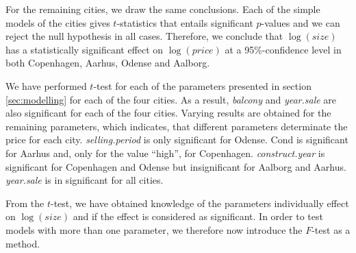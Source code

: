 For the remaining cities, we draw the same conclusions. 
Each of the simple models of the cities gives $t$-statistics that entails significant $p$-values and we can reject the null hypothesis in all cases. 
Therefore, we conclude that $\log(size)$ has a statistically significant effect on $\log(price)$ at a 95\%-confidence level in both Copenhagen, Aarhus, Odense and Aalborg. 

We have performed $t$-test for each of the parameters presented in section \ref{sec:modelling} for each of the four cities. As a result, \textit{balcony} and \textit{year.sale} are also significant for each of the four cities. 
Varying results are obtained for the remaining parameters, which indicates, that different parameters determinate the price for each city. \textit{selling.period} is only significant for Odense. 
Cond is significant for Aarhus and, only for the value ``high'', for Copenhagen. 
\textit{construct.year} is significant for Copenhagen and Odense but insignificant for Aalborg and Aarhus.
\textit{year.sale} is in significant for all cities.

From the $t$-test, we have obtained knowledge of the parameters individually effect on $\log(size)$ and if the effect is considered as significant. 
In order to test models with more than one parameter, we therefore now introduce the $F$-test as a method.





